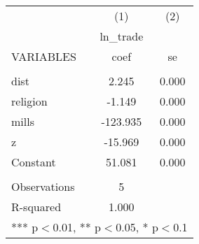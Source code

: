 \documentclass[]{article}
\begin{document}
\begin{tabular}{lcc} \hline
 & (1) & (2) \\
 & ln\_trade &  \\
VARIABLES & coef & se \\ \hline
 &  &  \\
dist & 2.245 & 0.000 \\
religion & -1.149 & 0.000 \\
mills & -123.935 & 0.000 \\
z & -15.969 & 0.000 \\
Constant & 51.081 & 0.000 \\
 &  &  \\
Observations & 5 &  \\
 R-squared & 1.000 &  \\ \hline
\multicolumn{3}{c}{ *** p$<$0.01, ** p$<$0.05, * p$<$0.1} \\
\end{tabular}
\end{document}
